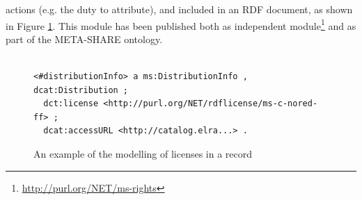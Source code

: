 \documentclass{llncs}
\begin{document}
actions (e.g. the duty to attribute), and included in an RDF
document, as shown in Figure \ref{fig:license-example}.
This module has been published both as independent module\footnote{\url{http://purl.org/NET/ms-rights}} 
and as part of the META-SHARE ontology. 

\begin{figure}
\begin{verbatim}

<#distributionInfo> a ms:DistributionInfo , dcat:Distribution ;
  dct:license <http://purl.org/NET/rdflicense/ms-c-nored-ff> ;
  dcat:accessURL <http://catalog.elra...> .
\end{verbatim}
\caption{An example of the modelling of licenses in a record\label{fig:license-example}}
\end{figure}


\end{document}
